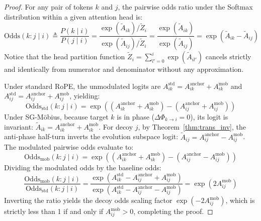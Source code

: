 \documentclass[11pt,a4paper]{article}
\theoremstyle{definition}
\begin{document}
\begin{proof}
For any pair of tokens $k$ and $j$, the pairwise odds ratio under the Softmax distribution within a given attention head is:
\begin{equation}
\mathrm{Odds}(k : j \mid i) \triangleq \frac{P(k \mid i)}{P(j \mid i)} = \frac{\exp(\tilde{A}_{ik}) / \tilde{Z}_i}{\exp(\tilde{A}_{ij}) / \tilde{Z}_i} = \frac{\exp(\tilde{A}_{ik})}{\exp(\tilde{A}_{ij})} = \exp(\tilde{A}_{ik} - \tilde{A}_{ij})
\end{equation}
Notice that the head partition function $\tilde{Z}_i = \sum_{l'=0}^i \exp(\tilde{A}_{il'})$ cancels strictly and identically from numerator and denominator without any approximation.

Under standard RoPE, the unmodulated logits are $A_{ik}^{\text{std}} = A_{ik}^{\text{anchor}} + A_{ik}^{\text{mob}}$ and $A_{ij}^{\text{std}} = A_{ij}^{\text{anchor}} + A_{ij}^{\text{mob}}$, yielding:
\begin{equation}
\mathrm{Odds}_{\text{std}}(k : j \mid i) = \exp\left( (A_{ik}^{\text{anchor}} + A_{ik}^{\text{mob}}) - (A_{ij}^{\text{anchor}} + A_{ij}^{\text{mob}}) \right)
\end{equation}
Under SG-M\"obius, because target $k$ is in phase ($\Delta\Phi_{k \to i} = 0$), its logit is invariant: $\tilde{A}_{ik} = A_{ik}^{\text{anchor}} + A_{ik}^{\text{mob}}$. For decoy $j$, by Theorem~\ref{thm:trans_inv}, the anti-phase half-turn inverts the evolution subspace logit: $\tilde{A}_{ij} = A_{ij}^{\text{anchor}} - A_{ij}^{\text{mob}}$. The modulated pairwise odds evaluate to:
\begin{equation}
\mathrm{Odds}_{\mathrm{mob}}(k : j \mid i) = \exp\left( (A_{ik}^{\text{anchor}} + A_{ik}^{\text{mob}}) - (A_{ij}^{\text{anchor}} - A_{ij}^{\text{mob}}) \right)
\end{equation}
Dividing the modulated odds by the baseline odds:
\begin{equation}
\frac{\mathrm{Odds}_{\mathrm{mob}}(k : j \mid i)}{\mathrm{Odds}_{\mathrm{std}}(k : j \mid i)} = \frac{\exp(A_{ik}^{\text{std}} - A_{ij}^{\text{anchor}} + A_{ij}^{\text{mob}})}{\exp(A_{ik}^{\text{std}} - A_{ij}^{\text{anchor}} - A_{ij}^{\text{mob}})} = \exp\left( 2 A_{ij}^{\text{mob}} \right)
\end{equation}
Inverting the ratio yields the decoy odds scaling factor $\exp(-2 A_{ij}^{\text{mob}})$, which is strictly less than 1 if and only if $A_{ij}^{\text{mob}} > 0$, completing the proof.
\end{proof}
\end{document}
